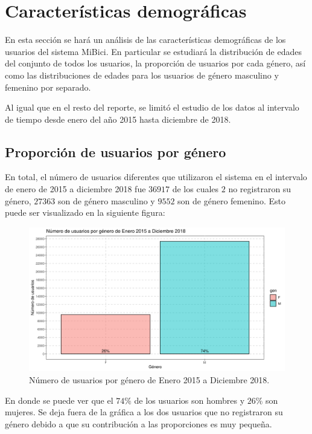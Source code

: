 \section*{Características demográficas}
En esta sección se hará un análisis de las características demográficas de los usuarios del sistema MiBici. En particular se estudiará la distribución de edades del conjunto de todos los usuarios, la proporción de usuarios por cada género, así como las distribuciones de edades para los usuarios de género masculino y femenino por separado.
\par Al igual que en el resto del reporte, se limitó el estudio de los datos al intervalo de tiempo desde enero del año 2015 hasta diciembre de 2018.
\subsection*{Proporción de usuarios por género}
En total, el número de usuarios diferentes que utilizaron el sistema en el intervalo de enero de 2015 a diciembre 2018 fue $36917$ de los cuales $2$ no registraron su género, $27363$ son de género masculino y $9552$ son de género femenino. Esto puede ser visualizado en la siguiente figura:
\begin{figure}[H]
	\centering
	\includegraphics[width=0.7\linewidth]{Graphics/genderProp}
	\caption{Número de usuarios por género de Enero 2015 a Diciembre 2018.}
	\label{fig:genderprop}
\end{figure}
En donde se puede ver que el $74\%$ de los usuarios son hombres y $26\%$ son mujeres. Se deja fuera de la gráfica a los dos usuarios que no registraron su género debido a que su contribución a las proporciones es muy pequeña.
